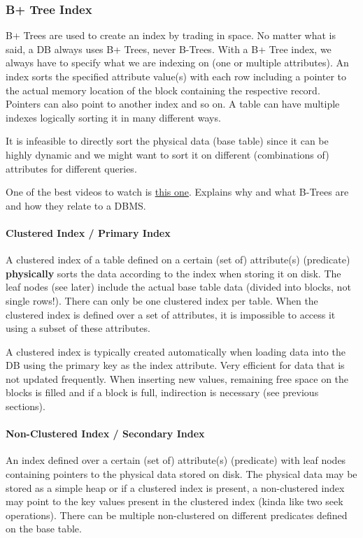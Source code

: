 \subsubsection{B+ Tree Index}

B+ Trees are used to create an index by trading in space. No matter what is said, a DB always uses B+ Trees, never B-Trees. With a B+ Tree index, we always have to specify what we are indexing on (one or multiple attributes). An index sorts the specified attribute value(s) with each row including a pointer to the actual memory location of the block containing the respective record. Pointers can also point to another index and so on. A table can have multiple indexes logically sorting it in many different ways.

It is infeasible to directly sort the physical data (base table) since it can be highly dynamic and we might want to sort it on different (combinations of) attributes for different queries.

One of the best videos to watch is \href{https://www.youtube.com/watch?v=aZjYr87r1b8}{this one}. Explains why and what B-Trees are and how they relate to a DBMS.


\paragraph{Clustered Index / Primary Index}
A clustered index of a table defined on a certain (set of) attribute(s) (predicate) \textbf{physically} sorts the data according to the index when storing it on disk. The leaf nodes (see later) include the actual base table data (divided into blocks, not single rows!). There can only be one clustered index per table. When the clustered index is defined over a set of attributes, it is impossible to access it using a subset of these attributes.

A clustered index is typically created automatically when loading data into the DB using the primary key as the index attribute. Very efficient for data that is not updated frequently. When inserting new values, remaining free space on the blocks is filled and if a block is full, indirection is necessary (see previous sections).

\paragraph{Non-Clustered Index / Secondary Index}
An index defined over a certain (set of) attribute(s) (predicate) with leaf nodes containing pointers to the physical data stored on disk. The physical data may be stored as a simple heap or if a clustered index is present, a non-clustered index may point to the key values present in the clustered index (kinda like two seek operations). There can be multiple non-clustered on different predicates defined on the base table.

